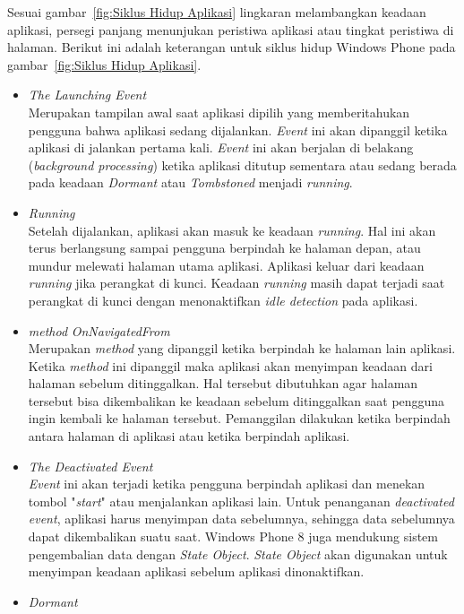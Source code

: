 Sesuai gambar~\ref{fig:Siklus Hidup Aplikasi} lingkaran melambangkan keadaan aplikasi, persegi panjang menunjukan peristiwa aplikasi atau tingkat peristiwa di halaman. Berikut ini adalah keterangan untuk siklus hidup Windows Phone pada gambar~\ref{fig:Siklus Hidup Aplikasi}. 
\begin{itemize}
	\item \textit{The Launching Event} \\
	Merupakan tampilan awal saat aplikasi dipilih yang memberitahukan pengguna bahwa aplikasi sedang dijalankan. \textit{Event} ini akan dipanggil ketika aplikasi di jalankan pertama kali. \textit{Event} ini akan berjalan di belakang (\textit{background processing}) ketika aplikasi ditutup sementara atau sedang berada pada keadaan \textit{Dormant} atau \textit{Tombstoned} menjadi \textit{running}.
	\item \textit{Running} \\
	Setelah dijalankan, aplikasi akan masuk ke keadaan \textit{running}. Hal ini akan terus berlangsung sampai pengguna berpindah ke halaman depan, atau mundur melewati halaman utama aplikasi. Aplikasi keluar dari keadaan \textit{running} jika perangkat di kunci. Keadaan \textit{running} masih dapat terjadi saat perangkat di kunci dengan menonaktifkan \textit{idle detection} pada aplikasi.
	\item \textit{method} \textit{OnNavigatedFrom} \\
	Merupakan \textit{method} yang dipanggil ketika berpindah ke halaman lain aplikasi. Ketika \textit{method} ini dipanggil maka aplikasi akan menyimpan keadaan dari halaman sebelum ditinggalkan. Hal tersebut dibutuhkan agar halaman tersebut bisa dikembalikan ke keadaan sebelum ditinggalkan saat pengguna ingin kembali ke halaman tersebut. Pemanggilan dilakukan ketika berpindah antara halaman di aplikasi atau ketika berpindah aplikasi.
	\item \textit{The Deactivated Event} \\
	\textit{Event} ini akan terjadi ketika pengguna berpindah aplikasi dan menekan tombol "\textit{start}" atau menjalankan aplikasi lain. Untuk penanganan \textit{deactivated event}, aplikasi harus menyimpan data sebelumnya, sehingga data sebelumnya dapat dikembalikan suatu saat. Windows Phone 8 juga mendukung sistem pengembalian data dengan \textit{State Object}. \textit{State Object} akan digunakan untuk menyimpan keadaan aplikasi sebelum aplikasi dinonaktifkan. 
	\item \textit{Dormant} \\

\end{itemize}
